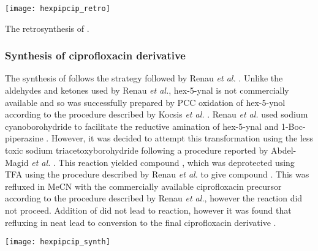 \begin{scheme}[H]
	\begin{center}
		\texttt{[image: hexpipcip\_retro]}
		\caption{The retrosynthesis of . \label{sch:hexpipcip_retro}}
	\end{center}
\end{scheme}

\subsubsection{Synthesis of ciprofloxacin derivative }

The synthesis of  follows the strategy followed by Renau \textit{et al.} \cite{Renau1996}. Unlike the aldehydes and ketones used by Renau \textit{et al.}\cite{Renau1996}, hex-5-ynal  is not commercially available and so was successfully prepared by PCC oxidation of hex-5-ynol  according to the procedure described by Kocsis \textit{et al.} \cite{Kocsis2012}. Renau \textit{et al.}\cite{Renau1996} used sodium cyanoborohydride to facilitate the reductive amination of hex-5-ynal  and 1-Boc-piperazine . However, it was decided to attempt this transformation using the less toxic sodium triacetoxyborohydride following a procedure reported by Abdel-Magid \textit{et al.} \cite{Abdel-Magid1996}. This reaction yielded compound , which was deprotected using TFA using the procedure described by Renau \textit{et al.}\cite{Renau1996} to give compound . This was refluxed in MeCN with the commercially available ciprofloxacin precursor  according to the procedure described by Renau \textit{et al.}\cite{Renau1996}, however the reaction did not proceed. Addition of  did not lead to reaction, however it was found that refluxing in neat  lead to conversion to the final ciprofloxacin derivative .

\begin{scheme}[H]
	\begin{center}
		\texttt{[image: hexpipcip\_synth]}
		\caption{The synthesis of . 
		a) Pyridinium chlorochromate, , r.t., 5 h, 72 \%.
		b) , 1,2-dichloroethane, r.t., 10.5 h, 99 \%.
		c) TFA, r.t., 1 h, 100 \%.
		d) , reflux, 15 h, 21 \%. %
		\label{sch:hexpipcip_synth}}
	\end{center}
\end{scheme}

